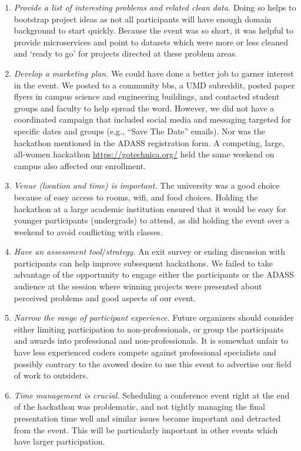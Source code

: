 \documentclass[11pt,twoside]{article}
\begin{document}
\begin{enumerate}

	\item \textit{Provide a list of interesting problems and related clean data.} Doing so helps to bootstrap project ideas as not all participants will have enough domain background to start quickly. Because the event was so short, it was helpful to provide microservices and point to datasets which were more or less cleaned and ‘ready to go’ for projects directed at these problem areas.

	\item \textit{Develop a marketing plan.} We could have done a better job to garner interest in the event. We posted to a community bbs, a UMD subreddit, posted paper flyers in campus science and engineering buildings, and contacted student groups and faculty to help spread the word. However, we did not have a coordinated campaign that included social media and messaging targeted for specific dates and groups (e.g., “Save The Date” emails). Nor was the hackathon mentioned in the ADASS registration form.  A competing, large, all-women hackathon \url{https://gotechnica.org/}  held the same weekend on campus also affected our enrollment.

	\item \textit{Venue (location and time) is important.} The university was a good choice because of easy access to rooms, wifi, and food choices. Holding the hackathon at a large academic institution ensured that it would be easy for younger participants (undergrads) to attend, as did holding the event over a weekend to avoid conflicting with classes.

	\item \textit{Have an assessment tool$\slash$strategy.} An exit survey or ending discussion with participants can help improve subsequent hackathons. We failed to take advantage of the opportunity to engage either the participants or the ADASS audience at the session where winning projects were presented about perceived problems and good aspects of our event.

	\item \textit{Narrow the range of participant experience.} Future organizers should consider either limiting participation to non-professionals, or group the participants and awards into professional and non-professionals.  It is somewhat unfair to have less experienced coders compete against professional specialists and possibly contrary to the avowed desire to use this event to advertise our field of work to outsiders.

	\item \textit{Time management is crucial.} Scheduling a conference event right at the end of the hackathon was problematic, and not tightly managing the final presentation time well and similar issues became important and detracted from the event. This will be particularly important in other events which have larger participation.

\end{enumerate}
\end{document}
